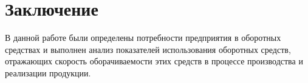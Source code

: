 \chapter{Заключение}

В данной работе были определены потребности предприятия в оборотных средствах и выполнен анализ показателей использования оборотных средств, отражающих скорость оборачиваемости этих средств в процессе производства и реализации продукции.